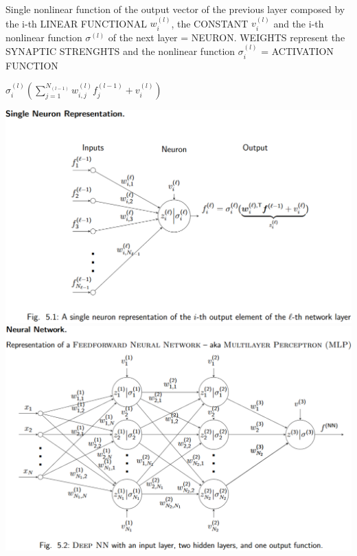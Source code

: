 \begin{sectionbox}
Single nonlinear function of the output vector of the previous layer composed by the i-th LINEAR FUNCTIONAL $w_i^{(l)}$, the CONSTANT $v_i^{(l)}$ and the i-th nonlinear function $\sigma^{(l)}$ of the next layer = NEURON. WEIGHTS represent the SYNAPTIC STRENGHTS and the nonlinear function $\sigma_i^{(l)}$ = ACTIVATION FUNCTION\\

\begin{emphbox}
$\sigma_i^{(l)}(\sum_{j=1}^{N_{(l-1)}}w_{i,j}^{(l)}f_j^{(l-1)}+v_i^{(l)})$
\end{emphbox}

\end{sectionbox}
\begin{sectionbox}

\includegraphics[width = \columnwidth]{./img/signalneuronrep}
\includegraphics[width = \columnwidth]{./img/neuralnetwork}

\end{sectionbox}

